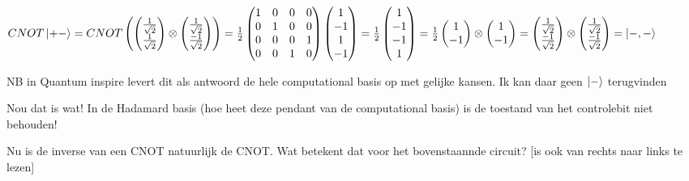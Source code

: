 \documentclass[a4paper, addpoints, 12pt
    , noanswers    %
    ]{exam}
\begin{document}
\begin{questions}
$
CNOT\ket{+-}=CNOT
\begin{pmatrix}
\begin{pmatrix}
\tfrac{1}{\sqrt{2}}\\
\tfrac{1}{\sqrt{2}}
\end{pmatrix}
\otimes
\begin{pmatrix}
\tfrac{1}{\sqrt{2}}\\
\tfrac{-1}{\sqrt{2}}
\end{pmatrix}
\end{pmatrix}
=
\frac{1}{2}
\begin{pmatrix}
1&0&0&0\\
0&1&0&0\\
0&0&0&1\\
0&0&1&0\\
\end{pmatrix}
\begin{pmatrix}
1\\
-1\\
1\\
-1
\end{pmatrix}
=
\frac{1}{2}
\begin{pmatrix}
1\\
-1\\
-1\\
1
\end{pmatrix}
=
\frac{1}{2}
\begin{pmatrix}
1\\
-1
\end{pmatrix}
\otimes
\begin{pmatrix}
1\\
-1
\end{pmatrix}
=
\begin{pmatrix}
\tfrac{1}{\sqrt{2}}\\
\tfrac{-1}{\sqrt{2}}
\end{pmatrix}
\otimes
\begin{pmatrix}
\tfrac{1}{\sqrt{2}}\\
\tfrac{-1}{\sqrt{2}}
\end{pmatrix}
=
\ket{-,-}
$

NB in Quantum inspire levert dit als antwoord de hele computational basis op met gelijke kansen. Ik kan daar geen $\ket{-}$ terugvinden

Nou dat is wat! In de Hadamard basis (hoe heet deze pendant van de computational basis) is de toestand van het controlebit niet behouden!

Nu is de inverse van een CNOT natuurlijk de CNOT. Wat betekent dat voor het bovenstaannde circuit?
[is ook van rechts naar links te lezen]


\end{questions}
\end{document}
